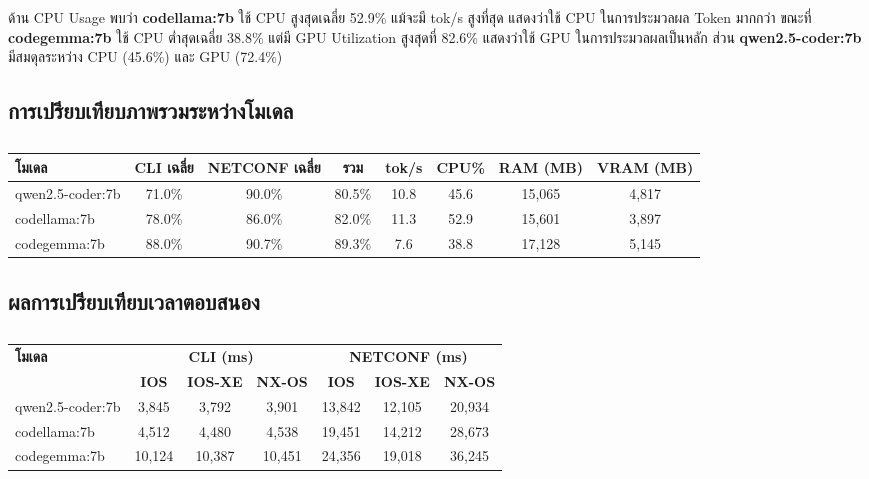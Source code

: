 \hspace*{1.3em}
ด้าน CPU Usage พบว่า \textbf{codellama:7b} ใช้ CPU สูงสุดเฉลี่ย 52.9\% แม้จะมี tok/s สูงที่สุด แสดงว่าใช้ CPU ในการประมวลผล Token มากกว่า ขณะที่ \textbf{codegemma:7b} ใช้ CPU ต่ำสุดเฉลี่ย 38.8\% แต่มี GPU Utilization สูงสุดที่ 82.6\% แสดงว่าใช้ GPU ในการประมวลผลเป็นหลัก ส่วน \textbf{qwen2.5-coder:7b} มีสมดุลระหว่าง CPU (45.6\%) และ GPU (72.4\%)

\subsection{การเปรียบเทียบภาพรวมระหว่างโมเดล}

\begin{table}[H]
    \caption{}
    \label{tab:benchmark-summary}
    \fontSixTeen
    \centering
    \begin{tabularx}{\textwidth}{|l|c|c|c|c|c|c|c|}
        \hline
        \textbf{โมเดล} & \textbf{CLI เฉลี่ย} & \textbf{NETCONF เฉลี่ย} & \textbf{รวม} & \textbf{tok/s} & \textbf{CPU\%} & \textbf{RAM (MB)} & \textbf{VRAM (MB)} \\
        \hline
        qwen2.5-coder:7b & 71.0\% & 90.0\% & 80.5\% & 10.8 & 45.6 & 15,065 & 4,817 \\
        \hline
        codellama:7b & 78.0\% & 86.0\% & 82.0\% & 11.3 & 52.9 & 15,601 & 3,897 \\
        \hline
        codegemma:7b & 88.0\% & 90.7\% & 89.3\% & 7.6 & 38.8 & 17,128 & 5,145 \\
        \hline
    \end{tabularx}
\end{table}

\subsection{ผลการเปรียบเทียบเวลาตอบสนอง}

\begin{table}[H]
    \caption{}
    \label{tab:benchmark-time}
    \fontSixTeen
    \centering
    \begin{tabularx}{\textwidth}{|l|c|c|c|c|c|c|}
        \hline
        \textbf{โมเดล} & \multicolumn{3}{c|}{\textbf{CLI (ms)}} & \multicolumn{3}{c|}{\textbf{NETCONF (ms)}} \\
        \cline{2-7}
        & \textbf{IOS} & \textbf{IOS-XE} & \textbf{NX-OS} & \textbf{IOS} & \textbf{IOS-XE} & \textbf{NX-OS} \\
        \hline
        qwen2.5-coder:7b & 3,845 & 3,792 & 3,901 & 13,842 & 12,105 & 20,934 \\
        \hline
        codellama:7b & 4,512 & 4,480 & 4,538 & 19,451 & 14,212 & 28,673 \\
        \hline
        codegemma:7b & 10,124 & 10,387 & 10,451 & 24,356 & 19,018 & 36,245 \\
        \hline
    \end{tabularx}
\end{table}

